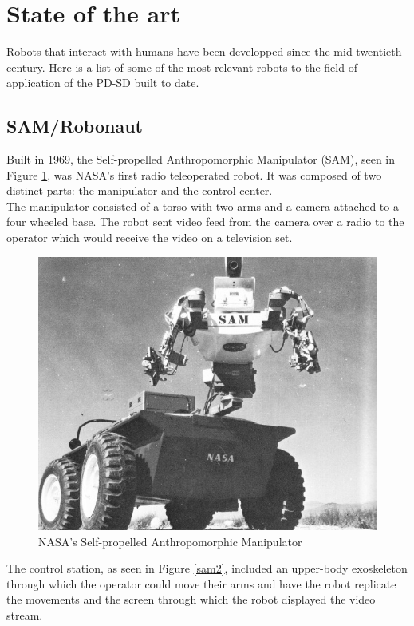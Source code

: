 \section{State of the art}

Robots that interact with humans have been developped since the mid-twentieth century. Here is a list of some of the most relevant robots to the field of application of the PD-SD built to date. 


\subsection{SAM/Robonaut}
Built in 1969, the Self-propelled Anthropomorphic Manipulator (SAM), seen in Figure \ref{sam}, was NASA's first radio teleoperated robot. It was composed of two distinct parts: the manipulator and the control center.\\

The manipulator consisted of a torso with two arms and a camera attached to a four wheeled base. The robot sent video feed from the camera over a radio to the operator which would receive the video on a television set.\\

	\begin{figure}[H]
			\centering
			\includegraphics[scale=0.5]{images/StateOfArt/SAM.jpg}
			\caption{NASA's Self-propelled Anthropomorphic Manipulator }
			\label{sam}
	\end{figure}
	\bigskip

The control station, as seen in Figure \ref{sam2}, included an upper-body exoskeleton through which the operator could move their arms and have the robot replicate the movements and the screen through which the robot displayed the video stream.\\

